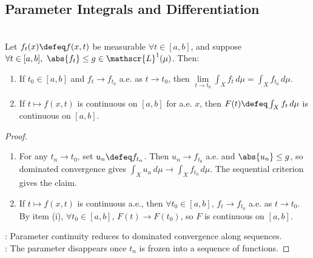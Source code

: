 \subsection{Parameter Integrals and Differentiation}

\begin{corollary} \label{cor:dominated-parameter-continuity} \\
Let $f_t(x)\defeq f(x,t)$ be measurable $\forall t\in[a,b]$, and suppose $\forall t\in[a,b],\ \abs{f_t}\leq g\in\mathscr{L}^1(\mu)$. Then:
\begin{enumerate}[label=(\roman*)]
\setlength{\itemsep}{0pt}
\item If $t_0\in[a,b]$ and $f_t\to f_{t_0}$ a.e. as $t\to t_0$, then $\lim\limits_{t\to t_0}\int_X f_t\,d\mu=\int_X f_{t_0}\,d\mu$.
\item If $t\mapsto f(x,t)$ is continuous on $[a,b]$ for a.e. $x$, then $F(t)\defeq\int_X f_t\,d\mu$ is continuous on $[a,b]$.
\end{enumerate}
\begin{proof}
\begin{enumerate}[label=(\roman*)]
\setlength{\itemsep}{0pt}
\item For any $t_n\to t_0$, set $u_n\defeq f_{t_n}$. Then $u_n\to f_{t_0}$ a.e. and $\abs{u_n}\leq g$, so dominated convergence gives $\int_Xu_n\,d\mu\to\int_Xf_{t_0}\,d\mu$. The sequential criterion gives the claim.
\item If $t\mapsto f(x,t)$ is continuous a.e., then $\forall t_0\in[a,b]$, $f_t\to f_{t_0}$ a.e. as $t\to t_0$.\\
By item (i), $\forall t_0\in[a,b]$, $F(t)\to F(t_0)$, so $F$ is continuous on $[a,b]$.
\end{enumerate}
: Parameter continuity reduces to dominated convergence along sequences.\\
: The parameter disappears once $t_n$ is frozen into a sequence of functions.
\end{proof}
\end{corollary}

